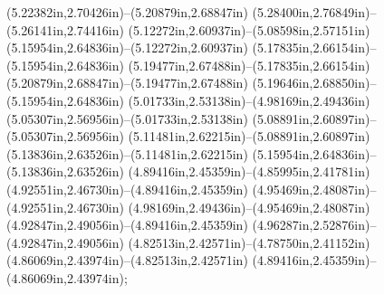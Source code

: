 (5.22382in,2.70426in)--(5.20879in,2.68847in) (5.28400in,2.76849in)--(5.26141in,2.74416in) (5.12272in,2.60937in)--(5.08598in,2.57151in) (5.15954in,2.64836in)--(5.12272in,2.60937in) (5.17835in,2.66154in)--(5.15954in,2.64836in) (5.19477in,2.67488in)--(5.17835in,2.66154in) (5.20879in,2.68847in)--(5.19477in,2.67488in) (5.19646in,2.68850in)--(5.15954in,2.64836in) (5.01733in,2.53138in)--(4.98169in,2.49436in) (5.05307in,2.56956in)--(5.01733in,2.53138in) (5.08891in,2.60897in)--(5.05307in,2.56956in) (5.11481in,2.62215in)--(5.08891in,2.60897in) (5.13836in,2.63526in)--(5.11481in,2.62215in) (5.15954in,2.64836in)--(5.13836in,2.63526in) (4.89416in,2.45359in)--(4.85995in,2.41781in) (4.92551in,2.46730in)--(4.89416in,2.45359in) (4.95469in,2.48087in)--(4.92551in,2.46730in) (4.98169in,2.49436in)--(4.95469in,2.48087in) (4.92847in,2.49056in)--(4.89416in,2.45359in) (4.96287in,2.52876in)--(4.92847in,2.49056in) (4.82513in,2.42571in)--(4.78750in,2.41152in) (4.86069in,2.43974in)--(4.82513in,2.42571in) (4.89416in,2.45359in)--(4.86069in,2.43974in);
